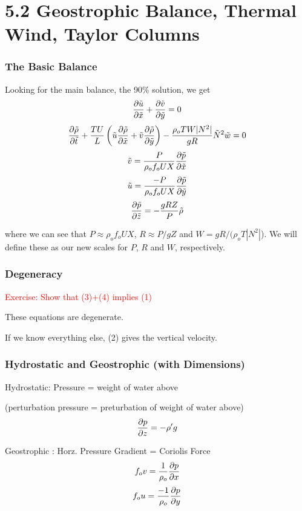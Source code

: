 \documentclass[xcolor=dvipsnames]{beamer}
\begin{document}
\section{5.2 Geostrophic Balance, Thermal Wind, Taylor Columns}

\begin{frame}
\frametitle{The Basic Balance}
Looking for the main balance, the 90\% solution, we get
\begin{equation}
\frac{\partial \tilde u}{\partial \tilde x} + \frac{\partial \tilde v}{\partial \tilde y} = 0
\end{equation}
\begin{equation}
\frac{\partial \tilde \rho}{\partial \tilde t} + \frac{TU}{L} \left( \tilde u \frac{\partial \tilde \rho}{\partial \tilde x} +\tilde v \frac{\partial \tilde \rho}{\partial \tilde y} \right) - \frac{\rho_o TW |N^2|}{gR} \tilde N^2  \tilde w =0
\end{equation}
\begin{equation}
\tilde v = \frac{P}{\rho_o f_o UX} \frac{\partial \tilde p}{\partial \tilde x}
\end{equation}
\begin{equation}
\tilde u = \frac{-P}{\rho_o f_o UX} \frac{\partial \tilde p}{\partial \tilde y}
\end{equation}
\begin{equation}
\frac{\partial \tilde p}{\partial \tilde z} = -\frac{gRZ}{P} \tilde \rho 
\end{equation}

where we can see that $P \approx \rho_o f_o UX$, $R \approx P/gZ$ and $W = gR/(\rho_o T |N^2|$).  We will define these as our new scales for $P$, $R$ and $W$, respectively.

\end{frame}

\begin{frame}
\frametitle{Degeneracy}

\textcolor{red}{Exercise: Show that (3)+(4) implies (1)}

These equations are degenerate. 

If we know everything else, (2) gives the vertical velocity.
\end{frame}

\begin{frame}
\frametitle{Hydrostatic and Geostrophic (with Dimensions)}

Hydrostatic: Pressure = weight of water above

(perturbation pressure = preturbation of weight of water above)
\[ \frac {\partial p}{\partial z} = - \rho^\prime g \]

Geostrophic : Horz. Pressure Gradient = Coriolis Force
\[ f_o v = \frac{1}{\rho_o} \frac {\partial p}{\partial x} \]
\[ f_o u = \frac{-1}{\rho_o} \frac {\partial p}{\partial y} \]
\end{frame}
\end{document}
